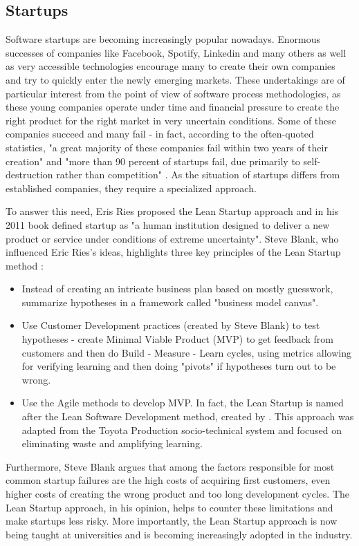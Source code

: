 \documentclass{article}
\begin{document}
\subsection{Startups}
Software startups are becoming increasingly popular nowadays. Enormous successes of companies like Facebook, Spotify, Linkedin and many others as well as very accessible technologies encourage many to create their own companies and try to quickly enter the newly emerging markets. These undertakings are of particular interest from the point of view of software process methodologies, as these young companies operate under time and financial pressure to create the right product for the right market in very uncertain conditions. Some of these companies succeed and many fail - in fact, according to the often-quoted statistics, "a great majority of these companies fail within two years of their creation" \citep[2]{paternoster2014software} and "more than 90 percent of startups fail, due primarily to self-destruction rather than competition" \citep[28]{giardino2014early}. As the situation of startups differs from established companies, they require a specialized approach. 

To answer this need, Eris Ries proposed the Lean Startup approach and in his 2011 book defined startup as "a human institution designed to deliver a new product or service under conditions of extreme uncertainty"\citep[27]{ries2011lean}. Steve Blank, who influenced Eric Ries's ideas, highlights three key principles of the Lean Startup method \citep{blank2013lean}:
\begin{itemize}
  \item Instead of creating an intricate business plan based on mostly guesswork, summarize hypotheses in a framework called "business model canvas".
  \item Use Customer Development practices (created by Steve Blank) to test hypotheses - create Minimal Viable Product (MVP) to get feedback from customers and then do Build - Measure - Learn cycles, using metrics allowing for verifying learning and then doing "pivots" if hypotheses turn out to be wrong.
  \item Use the Agile methods to develop MVP. In fact, the Lean Startup is named after the Lean Software Development method, created by \cite{poppendieck2003lean}. This approach was adapted from the Toyota Production socio-technical system and focused on eliminating waste and amplifying learning.
\end{itemize}

Furthermore, Steve Blank argues that among the factors responsible for most common startup failures are the high costs of acquiring first customers, even higher costs of creating the wrong product and too long development cycles. The Lean Startup approach, in his opinion, helps to counter these limitations and make startups less risky. More importantly, the Lean Startup approach is now being taught at universities and is becoming increasingly adopted in the industry.
\end{document}
